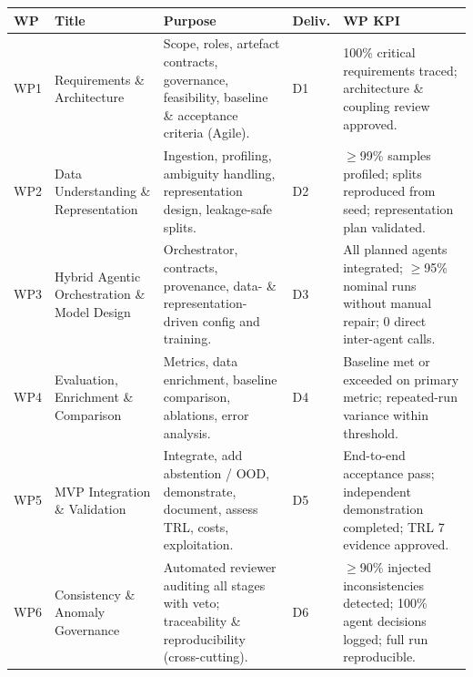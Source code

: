 \documentclass[11pt,a4paper]{article}
\newcommand{\hd}[1]{\cellcolor{hdr}\textbf{#1}}
\begin{document}
\vspace{4pt}
\noindent
\begin{minipage}{\textwidth}
\begin{tabularx}{\textwidth}{|Y{0.8cm}|P{3.1cm}|L|Y{1.0cm}|L|}
\hline
\hd{WP} & \hd{Title} & \hd{Purpose} & \hd{Deliv.} & \hd{WP KPI} \\ \hline
WP1 & Requirements \& Architecture & Scope, roles, artefact contracts, governance, feasibility, baseline \& acceptance criteria (Agile). & D1 & 100\% critical requirements traced; architecture \& coupling review approved. \\ \hline
WP2 & Data Understanding \& Representation & Ingestion, profiling, ambiguity handling, representation design, leakage-safe splits. & D2 & $\geq$99\% samples profiled; splits reproduced from seed; representation plan validated. \\ \hline
WP3 & Hybrid Agentic Orchestration \& Model Design & Orchestrator, contracts, provenance, data- \& representation-driven config and training. & D3 & All planned agents integrated; $\geq$95\% nominal runs without manual repair; 0 direct inter-agent calls. \\ \hline
WP4 & Evaluation, Enrichment \& Comparison & Metrics, data enrichment, baseline comparison, ablations, error analysis. & D4 & Baseline met or exceeded on primary metric; repeated-run variance within threshold. \\ \hline
WP5 & MVP Integration \& Validation & Integrate, add abstention / OOD, demonstrate, document, assess TRL, costs, exploitation. & D5 & End-to-end acceptance pass; independent demonstration completed; TRL 7 evidence approved. \\ \hline
WP6 & Consistency \& Anomaly Governance & Automated reviewer auditing all stages with veto; traceability \& reproducibility (cross-cutting). & D6 & $\geq$90\% injected inconsistencies detected; 100\% agent decisions logged; full run reproducible. \\ \hline
\end{tabularx}
\end{minipage}
\end{document}
